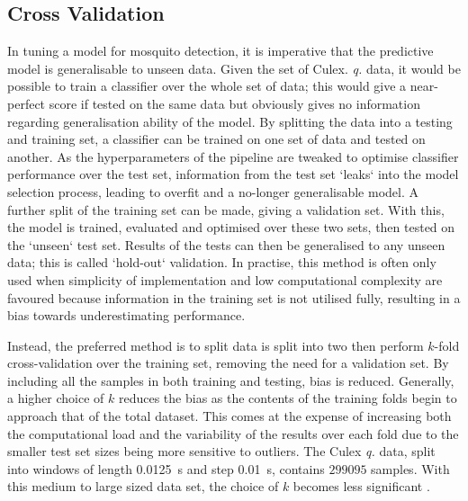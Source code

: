        
    \subsection{Cross Validation}
    \label{subsec:exp-clf-xval}
        In tuning a model for mosquito detection, it is imperative that the predictive model is generalisable to unseen data. Given the set of Culex. \textit{q.} data, it would be possible to train a classifier over the whole set of data; this would give a near-perfect score if tested on the same data but obviously gives no information regarding generalisation ability of the model. By splitting the data into a testing and training set, a classifier can be trained on one set of data and tested on another. As the hyperparameters of the pipeline are tweaked to optimise classifier performance over the test set, information from the test set `leaks` into the model selection process, leading to overfit and a no-longer generalisable model. A further split of the training set can be made, giving a validation set. With this, the model is trained, evaluated and optimised over these two sets, then tested on the `unseen` test set. Results of the tests can then be generalised to any unseen data; this is called `hold-out` validation. In practise, this method is often only used when simplicity of implementation and low computational complexity are favoured because information in the training set is not utilised fully, resulting in a bias towards underestimating performance.
     
        Instead, the preferred method is to split data is split into two then perform $k$-fold cross-validation over the training set, removing the need for a validation set. By including all the samples in both training and testing, bias is reduced. Generally, a higher choice of $k$ reduces the bias as the contents of the training folds begin to approach that of the total dataset. This comes at the expense of increasing both the computational load and the variability of the results over each fold due to the smaller test set sizes being more sensitive to outliers. The Culex \textit{q.} data, split into windows of length \SI{0.0125}{\second} and step \SI{0.01}{\second}, contains $299095$ samples. With this medium to large sized data set, the choice of $k$ becomes less significant \cite{Kohavi1995}. 
        
